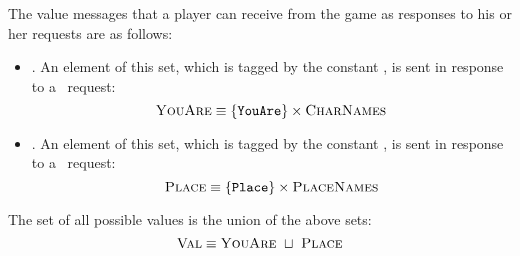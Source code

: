 The value messages that a player can receive from the game as
responses to his or her requests are as follows:
\begin{itemize}
\item \youarevalset. An element of this set, which is tagged by the
  constant \youaretg, is sent in response to a \whoamireqset\ request:
\[ \textsc{YouAre} \equiv \{ \texttt{YouAre} \} \times \textsc{CharNames} \]
\item \placevalset. An element of this set, which is tagged by the
  constant \placetg, is sent in response to a
  \whereamireqset\ request:
\[ \textsc{Place} \equiv \{ \texttt{Place} \} \times \textsc{PlaceNames} \]
\end{itemize}
The set of all possible values is the union of the above sets:
\begin{equation}
  \textsc{Val} \equiv \textsc{YouAre} ~\sqcup~ \textsc{Place}
\end{equation}
